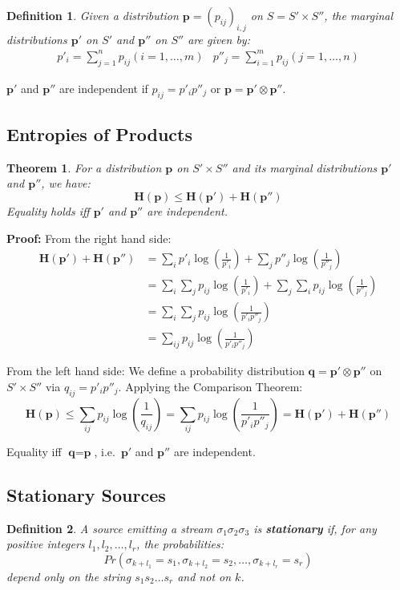\documentclass[11pt]{article}
\newtheorem{defn}{Definition}
\newtheorem{theo}{Theorem}
\begin{document}
\begin{defn}
  Given a distribution $\textbf{p} = (p_{ij})_{i, j}$ on $S = S' \times S''$, the marginal distributions $\textbf{p}'$ on $S'$ and $\textbf{p}''$ on $S''$ are given by:
  \begin{align*}
    p'_i = \sum_{j = 1}^n p_{ij} (i = 1, \ldots, m) & p''_j = \sum_{i = 1}^m p_{ij} (j = 1, \ldots, n)
  \end{align*}
\end{defn}

$\textbf{p}'$ and $\textbf{p}''$ are independent if $p_{ij} = p'_i p''_j$ or $\textbf{p} = \textbf{p}' \otimes \textbf{p}''$.

\subsection{Entropies of Products}
\begin{theo}
  For a distribution $\textbf{p}$ on $S' \times S''$ and its marginal distributions $\textbf{p}'$ and $\textbf{p}''$, we have:
  \[
    \textbf{H}(\textbf{p}) \leq \textbf{H}(\textbf{p}') + \textbf{H}(\textbf{p}'')
  \]
  Equality holds iff $\textbf{p}'$ and $\textbf{p}''$ are independent.
\end{theo}

\textbf{Proof:}
From the right hand side:
\begin{align*}
  \textbf{H}(\textbf{p}') + \textbf{H}(\textbf{p}'') &= \sum_i p'_i \log(\frac{1}{p'_i}) + \sum_j p''_j \log(\frac{1}{p''_j}) \\
  &= \sum_i \sum_j p_{ij} \log(\frac{1}{p'_i}) + \sum_j \sum_i p_{ij} \log(\frac{1}{p''_j}) \\
  &= \sum_i \sum_j p_{ij} \log(\frac{1}{p'_ip''_j}) \\
  &= \sum_{ij} p_{ij} \log(\frac{1}{p'_ip''_j})
\end{align*}

From the left hand side:
We define a probability distribution $\textbf{q} = \textbf{p}' \otimes \textbf{p}''$ on $S' \times S''$ via $q_{ij} = p'_ip''_j$.
Applying the Comparison Theorem:
\[
  \textbf{H}(\textbf{p}) \leq \sum_{ij} p_{ij} \log(\frac{1}{q_{ij}}) = \sum_{ij} p_{ij} \log(\frac{1}{p'_ip''_j}) = \textbf{H}(\textbf{p}') + \textbf{H}(\textbf{p}'')
\]

Equality iff $\textbf{q} = \textbf{p}$, i.e.\ $\textbf{p}'$ and $\textbf{p}''$ are independent.

\subsection{Stationary Sources}
\begin{defn}
  A source emitting a stream $\sigma_1 \sigma_2 \sigma_3$ is \textbf{stationary} if, for any positive integers $l_1, l_2, \ldots, l_r$, the probabilities:
  \[
    Pr(\sigma_{k + l_1} = s_1, \sigma_{k + l_2} = s_2, \ldots, \sigma_{k + l_r} = s_r)
  \]
  depend only on the string $s_1 s_2 \ldots s_r$ and not on $k$.
\end{defn}
\end{document}
